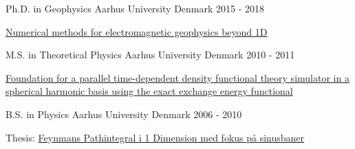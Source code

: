 

\begin{cventries}

  \cventry
    {Ph.D. in Geophysics} %
    {Aarhus University} %
    {Denmark} %
    {2015 - 2018} %
    {
      \begin{cvitems} %
        \item {\href{https://www.forskningsdatabasen.dk/en/catalog/2392633187}{Numerical methods for electromagnetic geophysics beyond 1D}}
      \end{cvitems}
    }

  \cventry
    {M.S. in Theoretical Physics} %
    {Aarhus University} %
    {Denmark} %
    {2010 - 2011} %
    {
      \begin{cvitems} %
        \item {\href{https://phys.au.dk/fileadmin/site_files/forskning/ltc/theses/thesistue.pdf}{Foundation for a parallel time-dependent density functional theory simulator in a spherical harmonic basis using the exact exchange energy functional}}
      \end{cvitems}
    }

  \cventry
    {B.S. in Physics} %
    {Aarhus University} %
    {Denmark} %
    {2006 - 2010} %
    {
      \begin{cvitems} %
        \item {Thesis: \href{https://users-phys.au.dk/~fedorov/subatom/bachelor/tue-feynman-path.pdf}{Feynmans Pathintegral i 1 Dimension med fokus på sinusbaner}}
      \end{cvitems}
    }

\end{cventries}
